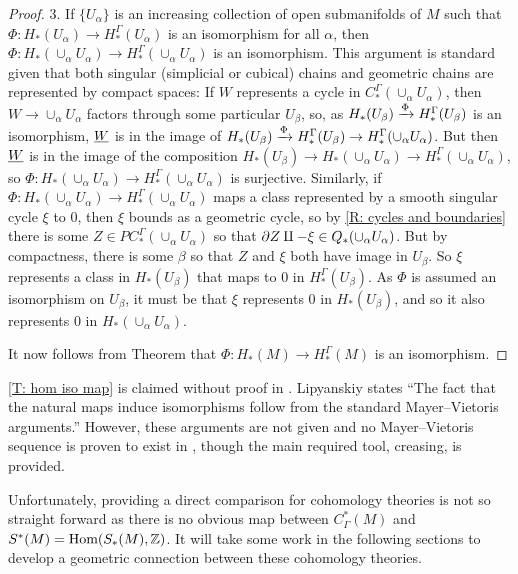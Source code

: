 \begin{proof}
	3.
	If $\{U_\alpha\}$ is an increasing collection of open submanifolds of $M$ such that $\Phi \colon H_*(U_\alpha) \to H_*^\Gamma(U_\alpha)$ is an isomorphism for all $\alpha$, then $\Phi \colon H_*(\cup_\alpha U_\alpha) \to H_*^\Gamma(\cup_\alpha U_\alpha)$ is an isomorphism.
	This argument is standard given that both singular (simplicial or cubical) chains and geometric chains are represented by compact spaces: If $W$ represents a cycle in $C_*^\Gamma(\cup_\alpha U_\alpha)$, then $W \to \cup_\alpha U_\alpha$ factors through some particular $U_\beta$, so, as $H_*(U_\beta) \xrightarrow{\Phi}H_*^\Gamma(U_\beta)$ is an isomorphism, $\underline{W}$ is in the image of $H_*(U_\beta) \xrightarrow{\Phi}H_*^\Gamma(U_\beta) \to H_*^\Gamma(\cup_\alpha U_\alpha)$.
	But then $\underline{W}$ is in the image of the composition $H_*(U_\beta) \to H_*(\cup_\alpha U_\alpha) \to H_*^\Gamma(\cup_\alpha U_\alpha)$, so $\Phi \colon H_*(\cup_\alpha U_\alpha) \to H_*^\Gamma(\cup_\alpha U_\alpha)$ is surjective.
	Similarly, if $\Phi \colon H_*(\cup_\alpha U_\alpha) \to H_*^\Gamma(\cup_\alpha U_\alpha)$ maps a class represented by a smooth singular cycle $\xi$ to $0$, then $\xi$ bounds as a geometric cycle, so by \cref{R: cycles and boundaries} there is some $Z \in PC_*^\Gamma(\cup_\alpha U_\alpha)$ so that $\partial Z \amalg -\xi \in Q_*(\cup_\alpha U_\alpha)$.
	But by compactness, there is some $\beta$ so that $Z$ and $\xi$ both have image in $U_\beta$.
	So $\xi$ represents a class in $H_*(U_\beta)$ that maps to $0$ in $H_*^\Gamma(U_\beta)$.
	As $\Phi$ is assumed an isomorphism on $U_\beta$, it must be that $\xi$ represents $0$ in $H_*(U_\beta)$, and so it also represents $0$ in $H_*(\cup_\alpha U_\alpha)$.

	It now follows from Theorem \cite[5.1.1]{Frie20} that $\Phi: H_*(M) \to H_*^\Gamma(M)$ is an isomorphism.
\end{proof}

\cref{T: hom iso map} is claimed without proof in \cite[Section 10]{Lipy14}.
Lipyanskiy states ``The fact that the natural maps induce isomorphisms follow from the standard Mayer--Vietoris arguments.'' However, these arguments are not given and no Mayer--Vietoris sequence is proven to exist in \cite{Lipy14}, though the main required tool, creasing, is provided.

Unfortunately, providing a direct comparison for cohomology theories is not so straight forward as there is no obvious map between $C^*_\Gamma(M)$ and $S^*(M) = \textup{Hom}(S_*(M),\mathbb{Z})$.
It will take some work in the following sections to develop a geometric connection between these cohomology theories.

